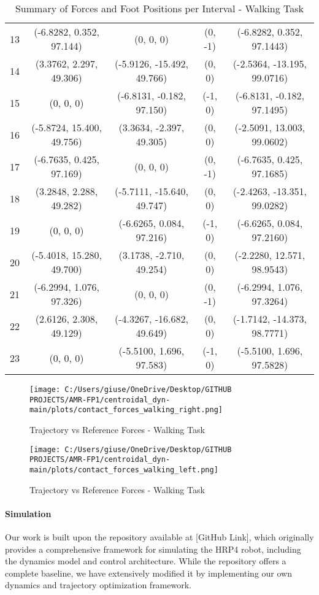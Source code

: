 \documentclass[main.tex]{subfiles}
\begin{document}
\begin{table}[H]
{\begin{tabular}{c|c|c|c|c}
            13 & (-6.8282, 0.352, 97.144) & (0, 0, 0) & (0, -1) & (-6.8282, 0.352, 97.1443) \\
            14 & (3.3762, 2.297, 49.306) & (-5.9126, -15.492, 49.766) & (0, 0) & (-2.5364, -13.195, 99.0716) \\
            15 & (0, 0, 0) & (-6.8131, -0.182, 97.150) & (-1, 0) & (-6.8131, -0.182, 97.1495) \\
            16 & (-5.8724, 15.400, 49.756) & (3.3634, -2.397, 49.305) & (0, 0) & (-2.5091, 13.003, 99.0602) \\
            17 & (-6.7635, 0.425, 97.169) & (0, 0, 0) & (0, -1) & (-6.7635, 0.425, 97.1685) \\
            18 & (3.2848, 2.288, 49.282) & (-5.7111, -15.640, 49.747) & (0, 0) & (-2.4263, -13.351, 99.0282) \\
            19 & (0, 0, 0) & (-6.6265, 0.084, 97.216) & (-1, 0) & (-6.6265, 0.084, 97.2160) \\
            20 & (-5.4018, 15.280, 49.700) & (3.1738, -2.710, 49.254) & (0, 0) & (-2.2280, 12.571, 98.9543) \\
            21 & (-6.2994, 1.076, 97.326) & (0, 0, 0) & (0, -1) & (-6.2994, 1.076, 97.3264) \\
            22 & (2.6126, 2.308, 49.129) & (-4.3267, -16.682, 49.649) & (0, 0) & (-1.7142, -14.373, 98.7771) \\
            23 & (0, 0, 0) & (-5.5100, 1.696, 97.583) & (-1, 0) & (-5.5100, 1.696, 97.5828) \\
            \hline
        \end{tabular}
    }
    \caption{Summary of Forces and Foot Positions per Interval - Walking Task}
    \label{tab:data_table}
\end{table}
\begin{figure}[htbp]
    \centering
    \texttt{[image: C:/Users/giuse/OneDrive/Desktop/GITHUB PROJECTS/AMR-FP1/centroidal\_dyn-main/plots/contact\_forces\_walking\_right.png]}
    \caption{Trajectory vs Reference Forces - Walking Task}
    \label{fig:contact_forces_walking_right}
\end{figure}
\begin{figure}[htbp]
    \centering
    \texttt{[image: C:/Users/giuse/OneDrive/Desktop/GITHUB PROJECTS/AMR-FP1/centroidal\_dyn-main/plots/contact\_forces\_walking\_left.png]}
    \caption{Trajectory vs Reference Forces - Walking Task}
    \label{fig:contact_forces_walking_left}
\end{figure}


\paragraph{Simulation} 
Our work is built upon the repository available at [GitHub Link], which originally provides a comprehensive framework for simulating the HRP4 robot, including the dynamics model and control architecture. While the repository offers a complete baseline, we have extensively modified it by implementing our own dynamics and trajectory optimization framework. \\
\end{document}

